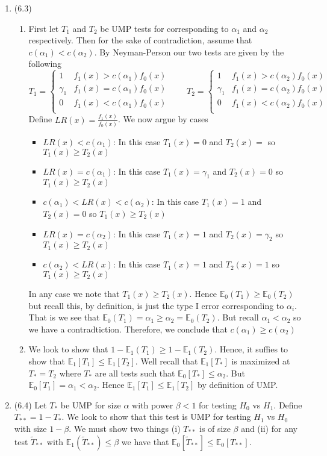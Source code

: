 \documentclass[12pt]{article}  %
\newcommand{\E}{{\mathbb{E}}}
\begin{document}
\begin{enumerate}
\item (6.3)
\begin{enumerate}
	\item First let $T_1$ and $T_2$ be UMP tests for corresponding to $\alpha_1$ and $\alpha_2$ respectively. Then for the sake of contradiction, assume that $c(\alpha_1)<c(\alpha_2)$. By Neyman-Person our two tests are given by the following 
	\[T_1 = \begin{cases}
	1 & f_1(x) > c(\alpha_1)f_0(x)\\
	\gamma_1 & f_1(x) = c(\alpha_1)f_0(x)\\
	0 & f_1(x) < c(\alpha_1)f_0(x)\\
	\end{cases}\hspace{2em}
	T_2 = \begin{cases}
	1 & f_1(x) > c(\alpha_2)f_0(x)\\
	\gamma_1 & f_1(x) = c(\alpha_2)f_0(x)\\
	0 & f_1(x) < c(\alpha_2)f_0(x)\\
	\end{cases}
	\]
	Define $LR(x) = \frac{f_1(x)}{f_0(x)}$. We now argue by cases
	\begin{itemize}
		\item $LR(x)<c(\alpha_1)$: In this case $T_1(x) = 0$ and $T_2(x)=$ so $T_1(x)\geq T_2(x)$
		\item $LR(x)=c(\alpha_1)$: In this case $T_1(x) = \gamma_1$ and $T_2(x)=0$ so $T_1(x)\geq T_2(x)$
		\item $c(\alpha_1)<LR(x)<c(\alpha_2)$: In this case $T_1(x) = 1$ and $T_2(x)=0$ so $T_1(x)\geq T_2(x)$
		\item $LR(x)=c(\alpha_2)$: In this case $T_1(x) = 1$ and $T_2(x)=\gamma_2$ so $T_1(x)\geq T_2(x)$
		\item $c(\alpha_2)<LR(x)$: In this case $T_1(x) = 1$ and $T_2(x)=1$ so $T_1(x)\geq T_2(x)$
	\end{itemize}
	In any case we note that $T_1(x)\geq T_2(x)$. Hence $\E_0(T_1) \geq \E_0(T_2)$ but recall this, by definition, is just the type I error corresponding to $\alpha_i$. That is we see that $\E_0(T_1) = \alpha_1 \geq \alpha_2=\E_0(T_2)$. But recall $\alpha_1<\alpha_2$ so we have a contradtiction. Therefore, we conclude that $c(\alpha_1)\geq c(\alpha_2)$
	\item We look to show that $1 - \E_1(T_1)\geq1 - \E_1(T_2)$. Hence, it suffies to show that $\E_1[T_1]\leq \E_1[T_2]$. Well recall that $\E_1[T_*]$ is maximized at $T_* = T_2$ where $T_*$ are all tests such that $\E_0[T_*]\leq \alpha_2$. But $\E_0[T_1] = \alpha_1 <\alpha_2$. Hence $\E_1[T_1]\leq \E_1[T_2]$ by definition of UMP. 
\end{enumerate}	
\item (6.4) Let $T_*$ be UMP for size $\alpha$ with power $\beta<1$ for testing $H_0$ vs $H_1$. Define $T_{**} = 1 - T_*$. We look to show that this test is UMP for testing $H_1$ vs $H_0$ with size $1-\beta$. We must show two things (i) $T_{**}$ is of size $\beta$ and (ii) for any test $\tilde{T}_{**}$ with $\E_1(\tilde{T}_{**})\leq \beta$ we have that $\E_0[\tilde{T}_{**}]\leq \E_0[T_{**}]$. 


\end{enumerate}
\end{document}
